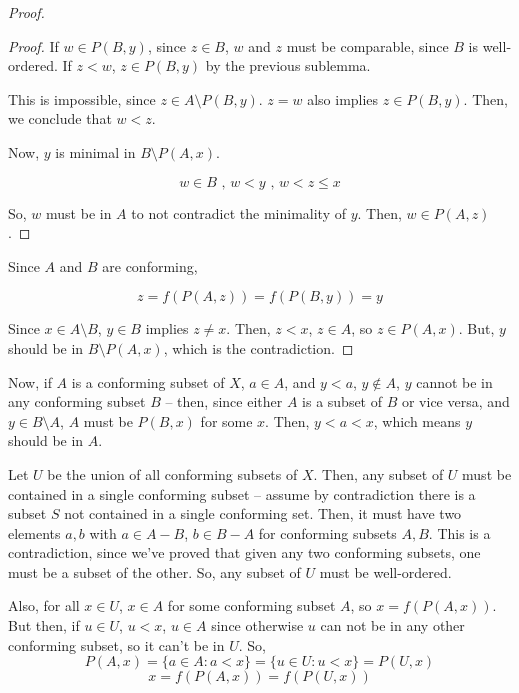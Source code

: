 \documentclass{article}
\begin{document}
\begin{proof}
\begin{proof}
        If $w \in P(B,y)$, since $z \in B$, $w$ and $z$ must be comparable,
        since $B$ is well-ordered. If $z < w$, $z \in P(B,y)$ by the previous
        sublemma.

        This is impossible, since $z \in A \setminus P(B,y)$. $z = w$ also
        implies $z \in P(B,y)$. Then, we conclude that $w < z$.

        Now, $y$ is minimal in $B \setminus P(A,x)$.

        \[w \in B \text{ , } w < y \text{ , } w<z \leq x\]

        So, $w$ must be in $A$ to not contradict the minimality of $y$. Then,
        $w \in P(A,z)$.

        \end{proof}

        Since $A$ and $B$ are conforming,

        \[z = f(P(A,z)) = f(P(B,y)) = y\]

        Since $x \in A \setminus B$, $y \in B$ implies $z \neq x$. Then, $z <
        x$, $z \in A$, so $z \in P(A,x)$. But, $y$ should be in $B \setminus
        P(A,x)$, which is the contradiction.
        \end{proof}

        Now, if $A$ is a conforming subset of $X$, $a \in A$, and $y < a$, $y
        \notin A$, $y$ cannot be in any conforming subset $B$ -- then, since
        either $A$ is a subset of $B$ or vice versa, and $y \in B \setminus A$,
        $A$ must be $P(B,x)$ for some $x$. Then, $y < a < x$, which means $y$
        should be in $A$.

        Let $U$ be the union of all conforming subsets of $X$. Then, any subset
        of $U$ must be contained in a single conforming subset -- assume by
        contradiction there is a subset $S$ not contained in a single conforming
        set. Then, it must have two elements $a, b$ with $a \in A - B$, $b \in B
        - A$ for conforming subsets $A, B$. This is a contradiction, since we've
          proved that given any two conforming subsets, one must be a subset of
          the other. So, any subset of $U$ must be well-ordered.

        Also, for all $x \in U$, $x \in A$ for some conforming subset $A$, so $x
        = f(P(A,x))$. But then, if $u \in U$, $u < x$, $u \in A$ since otherwise
        $u$ can not be in any other conforming subset, so it can't be in $U$.
        So, \[P(A,x) = \{a \in A: a < x\} = \{u \in U: u < x\} = P(U,x)\] \[x =
        f(P(A,x)) = f(P(U,x))\]
\end{document}
